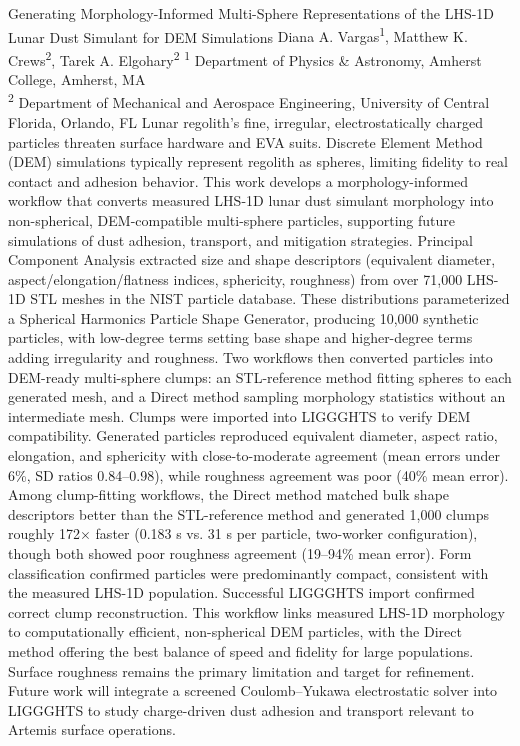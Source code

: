 \makeabstract
{ %
Generating Morphology-Informed Multi-Sphere Representations of the LHS-1D Lunar Dust Simulant for DEM Simulations
}
{ %
Diana A. Vargas\textsuperscript{1}, 
Matthew K. Crews\textsuperscript{2}, 
Tarek A. Elgohary\textsuperscript{2} 
}
{ %
\textsuperscript{1} Department of Physics \& Astronomy, Amherst College, Amherst, MA \\
\textsuperscript{2} Department of Mechanical and Aerospace Engineering, University of Central Florida, Orlando, FL
}
{ %
Lunar regolith's fine, irregular, electrostatically charged particles threaten surface hardware and EVA suits. Discrete Element Method (DEM) simulations typically represent regolith as spheres, limiting fidelity to real contact and adhesion behavior. This work develops a morphology-informed workflow that converts measured LHS-1D lunar dust simulant morphology into non-spherical, DEM-compatible multi-sphere particles, supporting future simulations of dust adhesion, transport, and mitigation strategies.
}
{ %
Principal Component Analysis extracted size and shape descriptors (equivalent diameter, aspect/elongation/flatness indices, sphericity, roughness) from over 71,000 LHS-1D STL meshes in the NIST particle database. These distributions parameterized a Spherical Harmonics Particle Shape Generator, producing 10,000 synthetic particles, with low-degree terms setting base shape and higher-degree terms adding irregularity and roughness. Two workflows then converted particles into DEM-ready multi-sphere clumps: an STL-reference method fitting spheres to each generated mesh, and a Direct method sampling morphology statistics without an intermediate mesh. Clumps were imported into LIGGGHTS to verify DEM compatibility.
}
{ %
Generated particles reproduced equivalent diameter, aspect ratio, elongation, and sphericity with close-to-moderate agreement (mean errors under 6\%, SD ratios 0.84--0.98), while roughness agreement was poor (40\% mean error). Among clump-fitting workflows, the Direct method matched bulk shape descriptors better than the STL-reference method and generated 1,000 clumps roughly 172$\times$ faster (0.183 s vs. 31 s per particle, two-worker configuration), though both showed poor roughness agreement (19--94\% mean error). Form classification confirmed particles were predominantly compact, consistent with the measured LHS-1D population. Successful LIGGGHTS import confirmed correct clump reconstruction.
}
{ %
This workflow links measured LHS-1D morphology to computationally efficient, non-spherical DEM particles, with the Direct method offering the best balance of speed and fidelity for large populations. Surface roughness remains the primary limitation and target for refinement. Future work will integrate a screened Coulomb--Yukawa electrostatic solver into LIGGGHTS to study charge-driven dust adhesion and transport relevant to Artemis surface operations.
}
 \newpage
